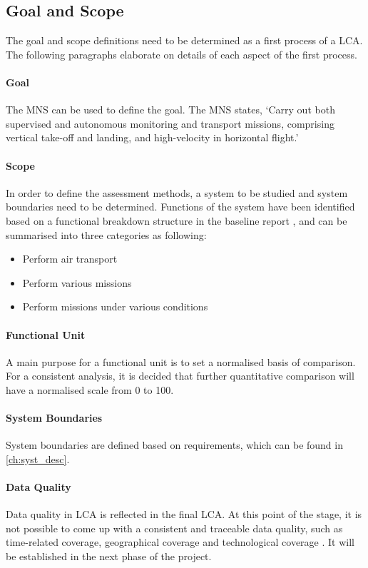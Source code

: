 \subsection{Goal and Scope}
The goal and scope definitions need to be determined as a first process of a LCA. The following paragraphs elaborate on details of each aspect of the first process. 

\paragraph{Goal} The MNS can be used to define the goal. The MNS states, `Carry out both supervised and autonomous monitoring and transport missions, comprising vertical take-off and landing, and high-velocity in horizontal flight.' %

\paragraph{Scope} In order to define the assessment methods, a system to be studied and system boundaries need to be determined. Functions of the system have been identified based on a functional breakdown structure in the baseline report \cite{baseline}, and can be summarised into three categories as following: 

\begin{itemize}
    \item Perform air transport
    \item Perform various missions
    \item Perform missions under various conditions
\end{itemize}

\paragraph{Functional Unit}
A main purpose for a functional unit is to set a normalised basis of comparison. For a consistent analysis, it is decided that further quantitative comparison will have a normalised scale from 0 to 100.

\paragraph{System Boundaries}
System boundaries are defined based on requirements, which can be found in \autoref{ch:syst_desc}.

\paragraph{Data Quality}
Data quality in LCA is reflected in the final LCA. At this point of the stage, it is not possible to come up with a consistent and traceable data quality, such as time-related coverage, geographical coverage and technological coverage \cite{lca}. It will be established in the next phase of the project. 

